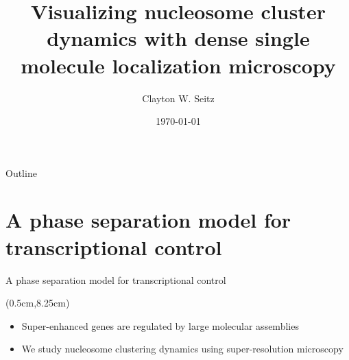\documentclass{beamer}					%
\title{Visualizing nucleosome cluster dynamics with dense single molecule localization microscopy}	%
\author{Clayton W. Seitz}								%
\date{\today}									%
\begin{document}
\begin{frame}
  \titlepage
\end{frame}

\begin{frame}{Outline}
    \tableofcontents
\end{frame}



%


\section{A phase separation model for transcriptional control}
\begin{frame}{A phase separation model for transcriptional control}




\begin{textblock*}{14cm}(0.5cm,8.25cm)
\begin{itemize}
\item Super-enhanced genes are regulated by large molecular assemblies
\item We study nucleosome clustering dynamics using super-resolution microscopy
\end{itemize}
\end{textblock*}

\end{frame}
\end{document}
